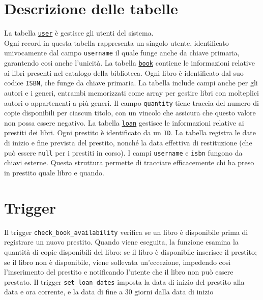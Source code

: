 \documentclass[]{report}
\begin{document}
\section{Descrizione delle tabelle}
La tabella \texttt{\underline{user}} è gestisce gli utenti del sistema.\\
Ogni record in questa tabella rappresenta un singolo utente, identificato univocamente dal campo \texttt{username} il quale funge anche da chiave primaria, garantendo cosi anche l'unicità.\bskip
La tabella \texttt{\underline{book}} contiene le informazioni relative ai libri presenti nel catalogo della biblioteca. Ogni libro è identificato dal suo codice \texttt{ISBN}, che funge da chiave primaria. La tabella include campi anche per gli autori e i generi, entrambi memorizzati come array per gestire libri con molteplici autori o appartenenti a più generi. Il campo \texttt{quantity} tiene traccia del numero di copie disponibili per ciascun titolo, con un vincolo che assicura che questo valore non possa essere negativo.\bskip
La tabella \texttt{\underline{loan}} gestisce le informazioni relative ai prestiti dei libri. Ogni prestito è identificato da un \texttt{ID}.\sskip
La tabella registra le date di inizio e fine prevista del prestito, nonché la data effettiva di restituzione (che può essere \texttt{null} per i prestiti in corso).\sskip
I campi \texttt{username} e \texttt{isbn} fungono da chiavi esterne. Questa struttura permette di tracciare efficacemente chi ha preso in prestito quale libro e quando.

\section{Trigger}
Il trigger \texttt{check\_book\_availability} verifica se un libro è disponibile prima di registrare un nuovo prestito. 
Quando viene eseguita, la funzione esamina la quantità di copie disponibili del libro: 
se il libro è disponibile inserisce il prestito; se il libro non è disponibile, viene sollevata un'eccezione, impedendo così l'inserimento del prestito e notificando l'utente che il libro non può essere prestato.\bskip
Il trigger \texttt{set\_loan\_dates} imposta la data di inizio del prestito alla data e ora corrente, e la data di fine a 30 giorni dalla data di inizio
\end{document}

